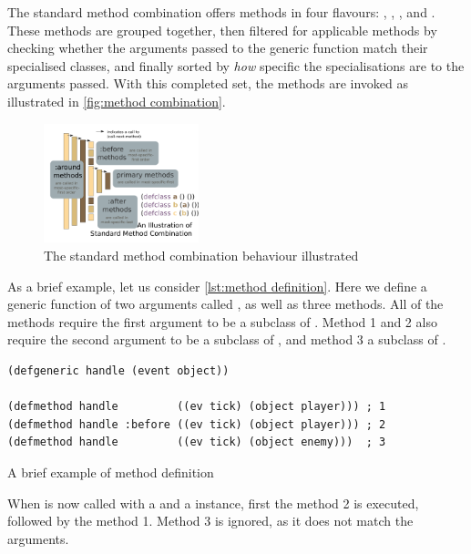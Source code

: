 \documentclass[a4paper]{paper}
\begin{document}
The standard method combination offers methods in four flavours: , , , and . These methods are grouped together, then filtered for applicable methods by checking whether the arguments passed to the generic function match their specialised classes, and finally sorted by \textit{how} specific the specialisations are to the arguments passed. With this completed set, the methods are invoked as illustrated in \autoref{fig:method combination}.

\begin{figure}[h]
  \centering
  \includegraphics[width=0.4\textwidth]{method combination.png}
  \caption{The standard method combination behaviour illustrated}
  \label{fig:method combination}
\end{figure}

As a brief example, let us consider \autoref{lst:method definition}. Here we define a generic function of two arguments called , as well as three methods. All of the methods require the first argument to be a subclass of . Method 1 and 2 also require the second argument to be a subclass of , and method 3 a subclass of .

\begin{listing}[h]
\begin{verbatim}
(defgeneric handle (event object))

(defmethod handle         ((ev tick) (object player))) ; 1
(defmethod handle :before ((ev tick) (object player))) ; 2
(defmethod handle         ((ev tick) (object enemy)))  ; 3
\end{verbatim}
\caption{A brief example of method definition}
\label{lst:method definition}
\end{listing}

\hypertarget{first-call}{When  is now called with a  and a  instance, first the method 2 is executed, followed by the method 1. Method 3 is ignored, as it does not match the arguments.}
\end{document}

